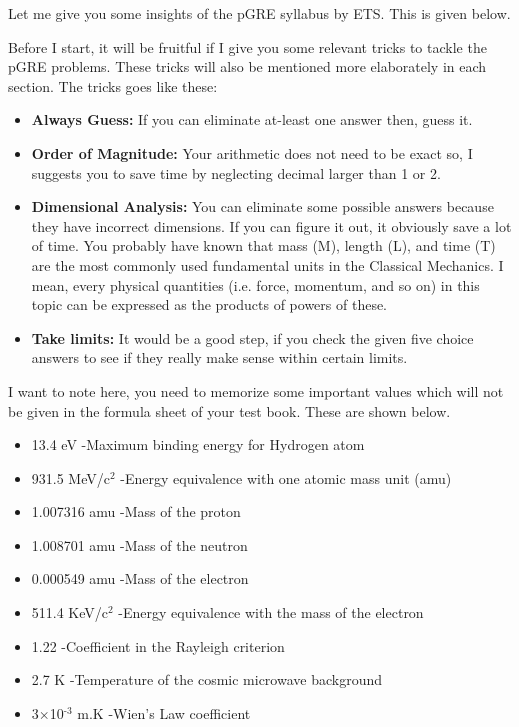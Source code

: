 \documentclass[12pt,a4paper]{article}
\begin{document}
Let me give you some insights of the pGRE syllabus by ETS. This is given below.


\tableofcontents


\vspace*{1cm}
Before I start, it will be fruitful if I give you some relevant tricks to tackle the pGRE problems. These tricks will also be mentioned more elaborately in each section. The tricks goes like these:

\begin{itemize}

\item \textbf{Always Guess:} If you can eliminate at-least one answer then, guess it.

\item \textbf{Order of Magnitude:} Your arithmetic does not need to be exact so, I suggests you to save time by neglecting decimal larger than 1 or 2.

\item \textbf{Dimensional Analysis:} You can eliminate some possible answers because they have incorrect dimensions. If you can figure it out, it obviously save a lot of time. You probably have known that mass (M), length (L), and time (T) are the most commonly used fundamental units in the Classical Mechanics. I mean, every physical quantities (i.e. force, momentum, and so on) in this topic can be expressed as the products of powers of these.

\item \textbf{Take limits:} It would be a good step, if you check the given five choice answers to see if they really make sense within certain limits.

\end{itemize}

I want to note here, you need to memorize some important values which will not be given in the formula sheet of your test book. These are shown below.

\begin{itemize}
\item 13.4 eV -Maximum binding energy for Hydrogen atom 
\item 931.5 MeV/c$^{\text{2}}$ -Energy equivalence with one atomic mass unit (amu)
\item 1.007316 amu -Mass of the proton
\item 1.008701 amu -Mass of the neutron 
\item 0.000549 amu -Mass of the electron 
\item 511.4 KeV/c$^{\text{2}}$ -Energy equivalence with the mass of the electron
\item 1.22 -Coefficient in the Rayleigh criterion
\item 2.7 K -Temperature of the cosmic microwave background
\item 3$\times$10$^{\text{-3}}$ m.K -Wien's Law coefficient
\end{itemize}
\end{document}
